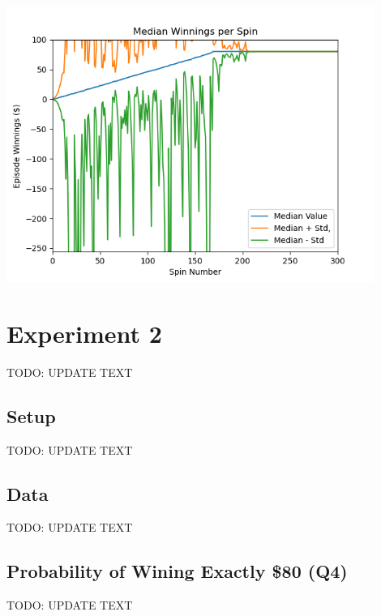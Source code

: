 \documentclass[
	letterpaper, %
]{jdf}
\begin{document}
\begin{jdffigure}
\includegraphics[height=9cm]{Figures/figure3.png}%
\label{fig:figure3}%
\end{jdffigure}

\section{Experiment 2}
TODO: UPDATE TEXT

\subsection{Setup}
TODO: UPDATE TEXT

\subsection{Data}
TODO: UPDATE TEXT

\subsection{Probability of Wining Exactly \$80 (Q4)}
TODO: UPDATE TEXT
\end{document}
